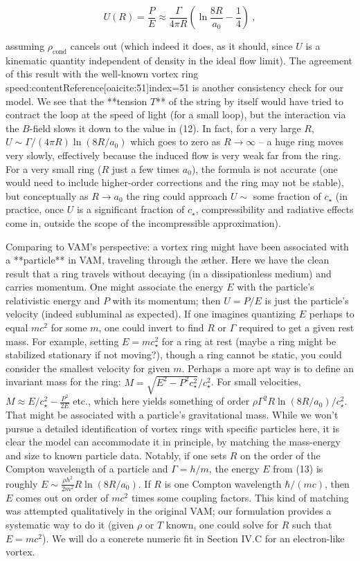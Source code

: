 \documentclass[12pt]{article}
\begin{document}
\[ U(R) = \frac{P}{E} \approx \frac{\Gamma}{4\pi R} \left(\ln\frac{8R}{a_0} - \frac{1}{4}\right)~, \] 

assuming $\rho_{\text{cond}}$ cancels out (which indeed it does, as it should, since $U$ is a kinematic quantity independent of density in the ideal flow limit). The agreement of this result with the well-known vortex ring speed:contentReference[oaicite:51]{index=51} is another consistency check for our model. We see that the **tension $T$** of the string by itself would have tried to contract the loop at the speed of light (for a small loop), but the interaction via the $B$-field slows it down to the value in (12). In fact, for a very large $R$, $U \sim \Gamma/(4\pi R)\ln(8R/a_0)$ which goes to zero as $R\to \infty$ – a huge ring moves very slowly, effectively because the induced flow is very weak far from the ring. For a very small ring ($R$ just a few times $a_0$), the formula is not accurate (one would need to include higher-order corrections and the ring may not be stable), but conceptually as $R \to a_0$ the ring could approach $U \sim$ some fraction of $c_\star$ (in practice, once $U$ is a significant fraction of $c_\star$, compressibility and radiative effects come in, outside the scope of the incompressible approximation). 

Comparing to VAM’s perspective: a vortex ring might have been associated with a **particle** in VAM, traveling through the æther. Here we have the clean result that a ring travels without decaying (in a dissipationless medium) and carries momentum. One might associate the energy $E$ with the particle’s relativistic energy and $P$ with its momentum; then $U = P/E$ is just the particle’s velocity (indeed subluminal as expected). If one imagines quantizing $E$ perhaps to equal $mc^2$ for some $m$, one could invert to find $R$ or $\Gamma$ required to get a given rest mass. For example, setting $E = m c_\star^2$ for a ring at rest (maybe a ring might be stabilized stationary if not moving?), though a ring cannot be static, you could consider the smallest velocity for given $m$. Perhaps a more apt way is to define an invariant mass for the ring: $M = \sqrt{E^2 - P^2 c_\star^2}/c_\star^2$. For small velocities, $M \approx E/c_\star^2 - \frac{P^2}{2E}$ etc., which here yields something of order $\rho \Gamma^2 R \ln(8R/a_0)/c_\star^2$. That might be associated with a particle’s gravitational mass. While we won’t pursue a detailed identification of vortex rings with specific particles here, it is clear the model can accommodate it in principle, by matching the mass-energy and size to known particle data. Notably, if one sets $R$ on the order of the Compton wavelength of a particle and $\Gamma = h/m$, the energy $E$ from (13) is roughly $E \sim \frac{\rho h^2}{2m^2} R \ln(8R/a_0)$. If $R$ is one Compton wavelength $\hbar/(mc)$, then $E$ comes out on order of $mc^2$ times some coupling factors. This kind of matching was attempted qualitatively in the original VAM; our formulation provides a systematic way to do it (given $\rho$ or $T$ known, one could solve for $R$ such that $E = m c^2$). We will do a concrete numeric fit in Section IV.C for an electron-like vortex. 
\end{document}
